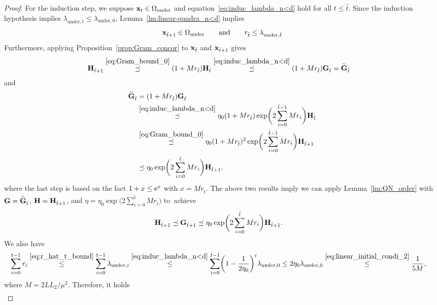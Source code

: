 \documentclass[11pt]{article}
\theoremstyle{plain}
\theoremstyle{definition}
\theoremstyle{remark}
\theoremstyle{plain}
\def\mG {{\bf G}}
\def\mH {{\bf H}}
\def\G{{\bf G}}
\def\H{{\bf H}}
\def\x{{\bf x}}
\begin{document}
\begin{proof}
For the induction step, we suppose  $\x_t\in\Omega_{\mathrm{under}}$ and equation~\eqref{eq:induc_lambda_n<d} hold for all $t\leq \hat t$.
Since the induction hypothesis implies $\lambda_{\mathrm{under},\hat t}\leq\lambda_{\mathrm{under},0}$, Lemma~\ref{lm:linear-quadra_n<d} implies 
\begin{align}\label{eq:r_hat_t_bound}
\x_{\hat t+1}\in\Omega_{\mathrm{under}}
\qquad\text{and}\qquad
r_{\hat t}\leq \lambda_{\mathrm{under},\hat t}
\end{align}
Furthermore, applying Proposition~\ref{prop:Gram_concor} to $\x_{\hat t}$ and
$\x_{\hat t+1}$ gives
\begin{align*}
\H_{\hat t+1}
&\overset{\eqref{eq:Gram_bound_0}}{\preceq}
(1+Mr_{\hat t})\H_{\hat t}
\overset{\eqref{eq:induc_lambda_n<d}}{\preceq}
(1+Mr_{\hat t})\G_{\hat t}
=\widetilde{\G}_{\hat t}
\end{align*}
and
\begin{align*}
\widetilde{\G}_{\hat t}
&=(1+Mr_{\hat t})\G_{\hat t}\\
&\overset{\eqref{eq:induc_lambda_n<d}}{\preceq}
\eta_0(1+Mr_{\hat t})
\exp\biggl(2\sum_{i=0}^{\hat t-1}Mr_i\biggr)\H_{\hat t}\\
&\overset{\eqref{eq:Gram_bound_0}}{\preceq}
\eta_0(1+Mr_{\hat t})^2
\exp\biggl(2\sum_{i=0}^{\hat t-1}Mr_i\biggr)\H_{\hat t+1}\\
&\preceq\eta_0\exp\biggl(2\sum_{i=0}^{\hat t}Mr_i\biggr)
\H_{\hat t+1},
\end{align*}
where the last step is based on the fact $1+x\leq {\rm e}^{x}$ with $x=Mr_{\hat{t}}$.
The above two results imply we can apply Lemma~\ref{lm:QN_order} with $\mG=\widetilde{\G}_{\hat t}$, $\mH=\H_{\hat t+1}$, and $\eta=\eta_0\exp\big(2\sum_{i=0}^{\hat t}Mr_i\big)$ to~achieve
\begin{align}
    \label{eq:G_tH_tleq2}
\H_{{\hat t}+1} &\preceq\G_{{\hat t}+1}
 \preceq\eta_0\exp\biggl(2\sum_{i=0}^{\hat t}Mr_i\biggr)\H_{{\hat t}+1}.
\end{align}
We also have
\begin{align}
    \label{eq:sum_r_t_bound}
\sum_{i=0}^{t-1}r_i
&\overset{\eqref{eq:r_hat_t_bound}}{\leq}
\sum_{i=0}^{t-1}\lambda_{\mathrm{under},i}
\overset{\eqref{eq:induc_lambda_n<d}}{\leq}
 \sum_{i=0}^{t-1}\biggl(1-\frac{1}{2\eta_0}\biggr)^i
 \lambda_{\mathrm{under},0}
 \leq2\eta_0\lambda_{\mathrm{under},0}
 \overset{\eqref{eq:linear_initial_condi_2}}{\leq}\frac{1}{5M},
\end{align}
where $M=2LL_2/\mu^2$.
Therefore, it holds
    \begin{align*}

\end{align*}
\end{proof}
\end{document}
